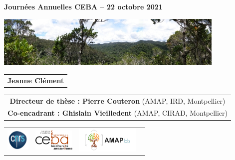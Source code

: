 {

  \begin{frame}
      \begin{center}
          \vspace{0.1cm}
       \small{\textbf{Journées Annuelles CEBA -- 22 octobre 2021}}
    \end{center}
    \vspace{-0.3cm}
    \titlepage %
      \vspace{-2.8cm}
    \begin{center}
        \vspace{0.1cm}
      \includegraphics[width=11cm]{figs/Banniere.png}
    \end{center}
    \begin{center}
    \begin{tabular}{c}
      \small{\textbf{Jeanne Clément}}
    \end{tabular}
   \begin{tabular}{c}
     \small{\textbf{Directeur de thèse : Pierre Couteron} (AMAP, IRD, Montpellier)} \\
     \small{\textbf{Co-encadrant : Ghislain Vieilledent} (AMAP, CIRAD, Montpellier)} 
    \end{tabular}
      \begin{tabular}{ccc}
        \quad \quad \includegraphics[height=1cm]{figs/logo_CNRS.png} & \quad \quad
        \includegraphics[height=1cm]{figs/Logo_CEBA_Détail de l'acronyme.jpg} & \quad
        \includegraphics[height=1.2cm]{figs/AMAP.jpg} 
        ~
      \end{tabular}
      
\end{center}
\vspace{0.2cm}
\end{frame}
}
